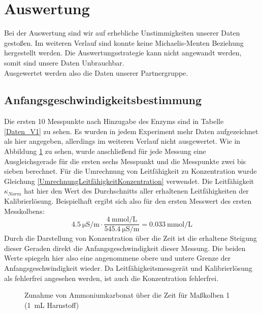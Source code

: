 \section{Auswertung}
Bei der Auswertung sind wir auf erhebliche Unstimmigkeiten unserer Daten gestoßen.
Im weiteren Verlauf sind konnte keine Michaelis-Menten Beziehung hergestellt werden.
Die Auswertungsstrategie kann nicht angewandt werden, somit sind unsere Daten Unbrauchbar.\\ 
Ausgewertet werden also die Daten unserer Partnergruppe.\\
\subsection{Anfangsgeschwindigkeitsbestimmung}
Die ersten 10 Messpunkte nach Hinzugabe des Enzyms sind in Tabelle \ref{Daten_V1} zu sehen.
Es wurden in jedem Experiment mehr Daten aufgezeichnet als hier angegeben, allerdings im weiteren Verlauf nicht ausgewertet.
Wie in Abbildung \ref{BSP_V0_Bestimmung} zu sehen, wurde anschließend für jede Messung eine Ausgleichsgerade für die ersten sechs Messpunkt und die Messpunkte zwei bis sieben berechnet.
Für die Umrechnung von Leitfähigkeit zu Konzentration wurde Gleichung \ref{UmrechnungLeitfähigkeitKonzentration} verwendet.
Die Leitfähigkeit $\kappa_{Norm}$ hat hier den Wert des Durchschnitts aller erhaltenen Leitfähigkeiten der Kalibrierlösung.
Beispielhaft ergibt sich also für den ersten Messwert des ersten Messkolbens: 
$$ \qty{4,5}{\micro\siemens\per\meter} \cdot \frac{\qty{4}{\milli\mole\per\liter}}{\qty{545,4}{\micro\siemens\per\meter}} = \qty{0,033}{\milli\mole\per\liter} $$
Durch die Darstellung von Konzentration über die Zeit ist die erhaltene Steigung dieser Geraden direkt die Anfangsgeschwindigkeit dieser Messung. 
Die beiden Werte spiegeln hier also eine angenommene obere und untere Grenze der Anfangsgeschwindigkeit wieder.
Da Leit\-fähig\-keits\-mess\-gerät und Kalibrierlösung als fehlerfrei angesehen werden, ist auch die Konzentration fehlerfrei.
\begin{figure}[t]
\centering
\resizebox{0.6\linewidth}{!}{%
}
\caption{Zunahme von Ammoniumkarbonat über die Zeit für Maßkolben 1 (\qty{1}{\milli\liter} Harnstoff)}
\label{BSP_V0_Bestimmung}
\end{figure}

